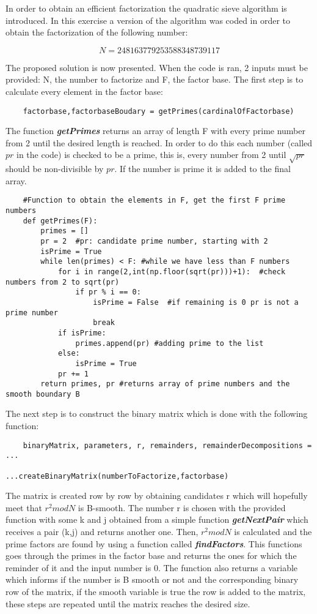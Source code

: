 \documentclass{article}
\begin{document}
In order to obtain an efficient factorization the quadratic sieve algorithm is introduced. In this exercise a version of the algorithm was coded in order to obtain the factorization of the following number:

$$N = 248163779253588348739117$$

The proposed solution is now presented. When the code is ran, 2 inputs must be provided: N, the number to factorize and F, the factor base. The first step is to calculate every element in the factor base:

\begin{verbatim}
    factorbase,factorbaseBoudary = getPrimes(cardinalOfFactorbase)
\end{verbatim}

The function \textit{\textbf{getPrimes}} returns an array of length F with every prime number from 2 until the desired length is reached. In order to do this each number (called $pr$ in the code) is checked to be a prime, this is, every number from 2 until $\sqrt{pr}$ should be non-divisible by $pr$. If the number is prime it is added to the final array.

\begin{verbatim}
    #Function to obtain the elements in F, get the first F prime numbers
    def getPrimes(F):  
        primes = []
        pr = 2  #pr: candidate prime number, starting with 2
        isPrime = True
        while len(primes) < F: #while we have less than F numbers
            for i in range(2,int(np.floor(sqrt(pr)))+1):  #check numbers from 2 to sqrt(pr)
                if pr % i == 0:
                    isPrime = False  #if remaining is 0 pr is not a prime number
                    break
            if isPrime:
                primes.append(pr) #adding prime to the list
            else:
                isPrime = True
            pr += 1
        return primes, pr #returns array of prime numbers and the smooth boundary B
\end{verbatim}

The next step is to construct the binary matrix which is done with the following function:

\begin{verbatim}
    binaryMatrix, parameters, r, remainders, remainderDecompositions = ...
                                         ...createBinaryMatrix(numberToFactorize,factorbase)
\end{verbatim}

The matrix is created row by row by obtaining candidates r which will hopefully meet that $r^2 mod N$ is B-smooth. The number r is chosen with the provided function with some k and j obtained from a simple function \textbf{\textit{getNextPair}} which receives a pair (k,j) and returns another one. Then, $r^2 mod N$ is calculated and the prime factors are found by using a function called \textit{\textbf{findFactors}}. This functions goes through the primes in the factor base and returns the ones for which the reminder of it and the input number is 0. The function also returns a variable which informs if the number is B smooth or not and the corresponding binary row of the matrix, if the smooth variable is true the row is added to the matrix, these steps are repeated until the matrix reaches the desired size.  
\end{document}
